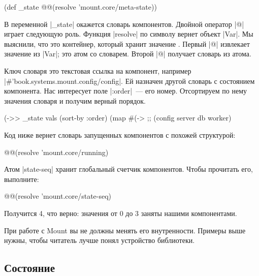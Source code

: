 \begin{english}
  \begin{clojure}
(def _state @@(resolve 'mount.core/meta-state))
  \end{clojure}
\end{english}

В переменной \spverb|_state| окажется словарь компонентов. Двойной оператор
\spverb|@| играет следующую роль. Функция \spverb|resolve| по символу вернет
объект \spverb|Var|. Мы выяснили, что это контейнер, который хранит
значение . Первый \spverb|@| извлекает значение из
\spverb|Var|; это атом со словарем. Второй \spverb|@| получает словарь из атома.

Ключ словаря это текстовая ссылка на компонент, например
\spverb|#'book.systems.mount.config/config|. Ей назначен другой словарь с
состоянием компонента. Нас интересует поле \spverb|:order|~--- его
номер. Отсортируем по нему значения словаря и получим верный порядок.

\begin{english}
  \begin{clojure}
(->> _state
     vals
     (sort-by :order)
     (map #(-> %
;; (config server db worker)
  \end{clojure}
\end{english}

Код ниже вернет словарь запущенных компонентов с похожей структурой:

\begin{english}
  \begin{clojure}
@@(resolve 'mount.core/running)
  \end{clojure}
\end{english}

Атом \spverb|state-seq| хранит глобальный счетчик компонентов. Чтобы прочитать
его, выполните:

\begin{english}
  \begin{clojure}
@@(resolve 'mount.core/state-seq)
  \end{clojure}
\end{english}

Получится 4, что верно: значения от 0 до 3 заняты нашими компонентами.

При работе с Mount вы не должны менять его внутренности. Примеры выше нужны,
чтобы читатель лучше понял устройство библиотеки.

\subsection{Состояние}

